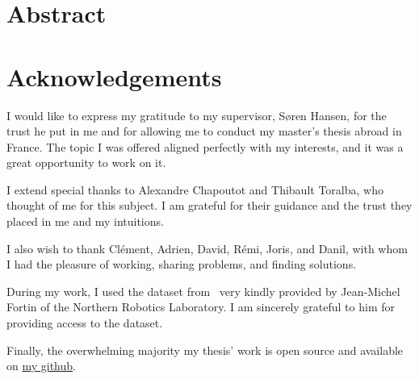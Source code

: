 \clearpage
\pagestyle{main}
\section*{Abstract}\label{sec:abstract}


\thesisabstract

\clearpage
\section*{Acknowledgements}\label{sec:acknowledgements}

I would like to express my gratitude to my supervisor, Søren Hansen, for the trust he put in me and for allowing me to conduct my master’s thesis abroad in France.
The topic I was offered aligned perfectly with my interests, and it was a great opportunity to work on it.

I extend special thanks to Alexandre Chapoutot and Thibault Toralba, who thought of me for this subject.
I am grateful for their guidance and the trust they placed in me and my intuitions.

I also wish to thank Clément, Adrien, David, Rémi, Joris, and Danil,
with whom I had the pleasure of working, sharing problems, and finding solutions.

During my work, I used the dataset from~ very kindly provided by Jean-Michel Fortin of the Northern Robotics Laboratory.
I am sincerely grateful to him for providing access to the dataset.

Finally, the overwhelming majority my thesis' work is open source and available on \href{https://github.com/Seb-sti1/mastersthesis}{my github}.